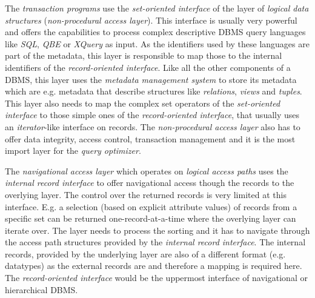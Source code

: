 	The \emph{transaction programs} use the \emph{set-oriented interface} of the layer of \emph{logical data structures} (\emph{non-procedural access layer}). This interface is usually very powerful and offers the capabilities to process complex descriptive DBMS query languages like \emph{SQL}, \emph{QBE} or \emph{XQuery} as input. As the identifiers used by these languages are part of the metadata, this layer is responsible to map those to the internal identifiers of the \emph{record-oriented interface}. Like all the other components of a DBMS, this layer uses the \emph{metadata management system} to store its metadata which are e.g. metadata that describe structures like \emph{relations}, \emph{views} and \emph{tuples}. This layer also needs to map the complex set operators of the \emph{set-oriented interface} to those simple ones of the \emph{record-oriented interface}, that usually uses an \emph{iterator}-like interface on records. The \emph{non-procedural access layer} also has to offer data integrity, access control, transaction management and it is the most import layer for the \emph{query optimizer}.
	
	The \emph{navigational access layer} which operates on \emph{logical access paths} uses the \emph{internal record interface} to offer navigational access though the records to the overlying layer. The control over the returned records is very limited at this interface. E.g. a selection (based on explicit attribute values) of records from a specific set can be returned one-record-at-a-time where the overlying layer can iterate over. The layer needs to process the sorting and it has to navigate through the access path structures provided by the \emph{internal record interface}. The internal records, provided by the underlying layer are also of a different format (e.g. datatypes) as the external records are and therefore a mapping is required here. The \emph{record-oriented interface} would be the uppermost interface of navigational or hierarchical DBMS.
	
